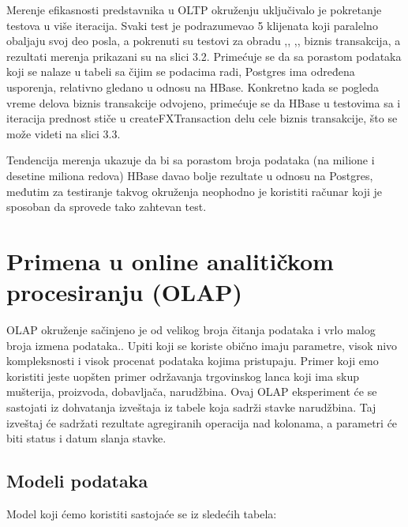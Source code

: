 \documentclass[12pt,oneside]{memoir}
\begin{document}
Merenje efikasnosti predstavnika u OLTP okruženju uključivalo je pokretanje testova u više iteracija. Svaki test je podrazumevao 5 klijenata koji paralelno obaljaju svoj deo posla, a pokrenuti su testovi za obradu ,, ,, biznis transakcija, a rezultati merenja prikazani su na slici 3.2. Primećuje se da sa porastom podataka koji se nalaze u tabeli sa čijim se podacima radi, Postgres ima određena usporenja, relativno gledano u odnosu na HBase. Konkretno kada se pogleda vreme delova biznis transakcije odvojeno, primećuje se da HBase u testovima sa  i  iteracija prednost stiče u createFXTransaction delu cele biznis transakcije, što se može videti na slici 3.3. 

Tendencija merenja ukazuje da bi sa porastom broja podataka (na milione i desetine miliona redova) HBase davao bolje rezultate u odnosu na Postgres, međutim za testiranje takvog okruženja neophodno je koristiti računar koji je sposoban da sprovede tako zahtevan test.


\section{Primena u online analitičkom procesiranju (OLAP)}

OLAP okruženje sačinjeno je od velikog broja čitanja podataka i vrlo malog broja izmena podataka.. Upiti koji se koriste obično imaju parametre, visok nivo kompleksnosti i visok procenat podataka kojima pristupaju.
Primer koji emo koristiti jeste uopšten primer održavanja trgovinskog lanca koji ima skup mušterija, proizvoda, dobavljača,  narudžbina. 
Ovaj OLAP eksperiment će se sastojati iz dohvatanja izveštaja iz tabele koja sadrži stavke narudžbina. Taj izveštaj će sadržati rezultate agregiranih operacija nad kolonama, a parametri će biti status i datum slanja stavke.

\subsection{Modeli podataka}

Model koji ćemo koristiti sastojaće se iz sledećih tabela:
\end{document}
